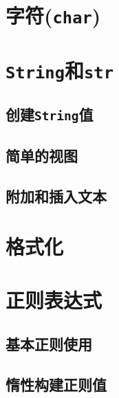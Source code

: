 \section{字符(\texttt{char})}

\section{\texttt{String}和\texttt{str}}

\subsection{创建\texttt{String}值}

\subsection{简单的视图}

\subsection{附加和插入文本}\label{AppendText}

\section{格式化}\label{format}

\section{正则表达式}

\subsection{基本正则使用}

\subsection{惰性构建正则值}\label{LazyRegex}
